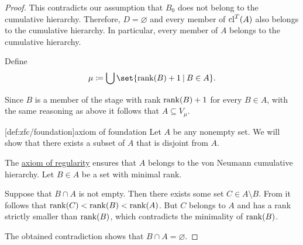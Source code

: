\begin{proof}
  This contradicts our assumption that \( B_0 \) does not belong to the cumulative hierarchy. Therefore, \( D = \varnothing \) and every member of \( \operatorname{cl}^T(A) \) also belongs to the cumulative hierarchy. In particular, every member of \( A \) belongs to the cumulative hierarchy.

  Define
  \begin{equation*}
    \mu \coloneqq \bigcup\set{ \rank(B) + 1 \given B \in A }.
  \end{equation*}

  Since \( B \) is a member of the stage with rank \( \operatorname{rank}(B) + 1 \) for every \( B \in A \), with the same reasoning as above it follows that \( A \subseteq V_\mu \).

  [def:zfc/foundation]{axiom of foundation} Let \( A \) be any nonempty set. We will show that there exists a subset of \( A \) that is disjoint from \( A \).

  The \hyperref[thm:axiom_of_regularity]{axiom of regularity} ensures that \( A \) belongs to the von Neumann cumulative hierarchy. Let \( B \in A \) be a set with minimal rank.

  Suppose that \( B \cap A \) is not empty. Then there exists some set \( C \in A \setminus B \). From  it follows that \( \operatorname{rank}(C) < \operatorname{rank}(B) < \operatorname{rank}(A) \). But \( C \) belongs to \( A \) and has a rank strictly smaller than \( \operatorname{rank}(B) \), which contradicts the minimality of \( \operatorname{rank}(B) \).

  The obtained contradiction shows that \( B \cap A = \varnothing \).
\end{proof}

